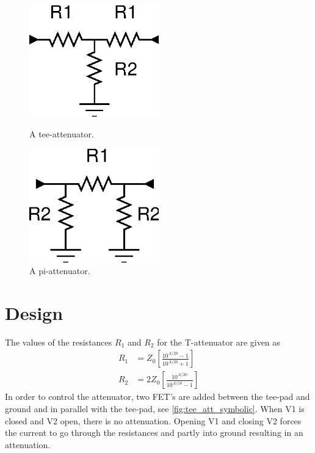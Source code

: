 		\begin{figure}[ht]
			\begin{minipage}[b]{0.5\linewidth}
				\centering
				\includegraphics[width=0.5\textwidth]{fig/attenuators/tee-attenuator-symbolic}
				\caption{A tee-attenuator.}\label{fig:tee_att_simple}
			\end{minipage}
			\hspace{0.5cm}
			\begin{minipage}[b]{0.5\linewidth}
				\centering
				\includegraphics[width=0.5\textwidth]{fig/attenuators/pi-attenuator-symbolic}
			\caption{A pi-attenuator.}\label{fig:pi_att_simple}
			\end{minipage}
		\end{figure}

	\section{Design}

		The values of the resistances $R_1$ and $R_2$ for the T-attenuator are given as \autocite{matthaei80}
		\begin{align*}
			R_1 &= Z_0 \left[\frac{10^{A/20}-1}{10^{A/20}+1}\right] \\
			R_2 &= 2Z_0 \left[\frac{10^{A/20}}{10^{A/10}-1}\right]
		\end{align*}
		In order to control the attenuator, two FET's are added between the tee-pad and ground and in parallel with the tee-pad, see \autoref{fig:tee_att_symbolic}. When V1 is closed and V2 open, there is no attenuation. Opening V1 and closing V2 forces the current to go through the resistances and partly into ground resulting in an attenuation.

